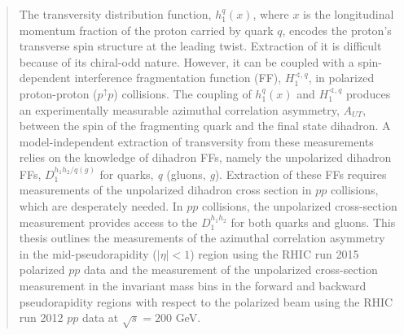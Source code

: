 \begin{abstract} 
\thispagestyle{plain}
\doublespacing
The transversity distribution function, $h_1^{q}(x)$, where $x$ is the longitudinal momentum fraction of the proton carried by quark $q$, encodes the proton's transverse spin structure at the leading twist. Extraction of it is difficult because of its chiral-odd nature. However, it can be coupled with a spin-dependent interference fragmentation function (FF), $H_1^{\sphericalangle, q}$, in polarized proton-proton ($p^\uparrow p$) collisions. The coupling of $h_1^{q}(x)$ and $H_1^{\sphericalangle, q}$ produces an experimentally measurable azimuthal correlation asymmetry, $A_{UT}$, between the spin of the fragmenting quark and the final state dihadron. A model-independent extraction of transversity from these measurements relies on the knowledge of dihadron FFs, namely the unpolarized dihadron FFs, $D_1^{h_1h_2/q(g)}$ for quarks, \emph{q} (gluons, \emph{g}). Extraction of these FFs requires measurements of the unpolarized dihadron cross section in $pp$ collisions, which are desperately needed. In $pp$ collisions, the unpolarized cross-section measurement provides access to the $D_1^{h_1h_2}$ for both quarks and gluons. This thesis outlines the measurements of the \dipion azimuthal correlation asymmetry in the mid-pseudorapidity ($|\eta|<1$) region using the RHIC run 2015 polarized $pp$ data and the measurement of the unpolarized \dipion cross-section measurement in the invariant mass bins in the forward and backward pseudorapidity regions with respect to the polarized beam using the RHIC run 2012 $pp$ data at $\sqrt{s}=200$ GeV.   
\end{abstract}
